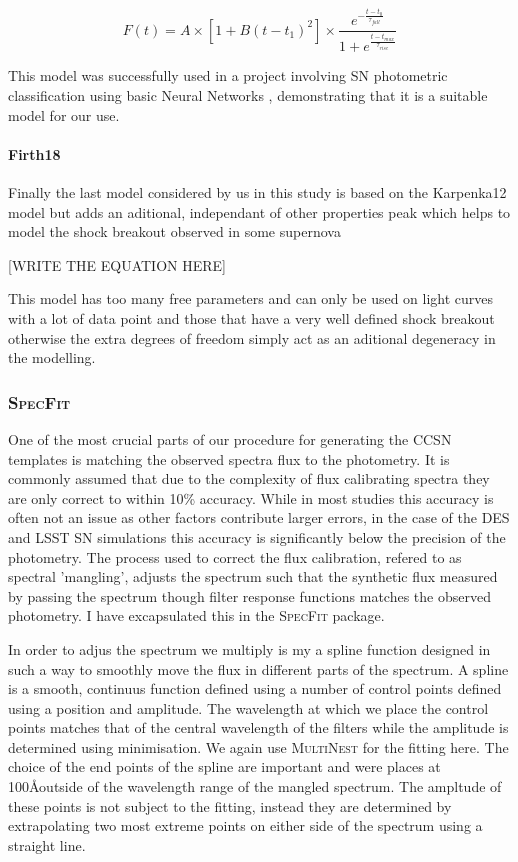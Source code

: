 \begin{equation}
  F(t) = A \times [1 + B(t - {t_1})^2] \times \frac{e^{-\frac{t - t_{0}}{\tau_{fall}}}} {1 + e^{\frac{t - t_{max}}{\tau_{rise}}}}
\end{equation}

This model was successfully used in a project involving SN photometric classification using basic Neural Networks \citep{Karpenka2012}, demonstrating that it is a suitable model for our use.

\paragraph{Firth18}
Finally the last model considered by us in this study is based on the Karpenka12 model but adds an aditional, independant of other properties peak which helps to model the shock breakout observed in some supernova

[WRITE THE EQUATION HERE]

This model has too many free parameters and can only be used on light curves with a lot of data point and those that have a very well defined shock breakout otherwise the extra degrees of freedom simply act as an aditional degeneracy in the modelling.

\subsubsection{\textsc{SpecFit}}
One of the most crucial parts of our procedure for generating the CCSN templates is matching the observed spectra flux to the photometry. It is commonly assumed that due to the complexity of flux calibrating spectra they are only correct to within 10\% accuracy. While in most studies this accuracy is often not an issue as other factors contribute larger errors, in the case of the DES and LSST SN simulations this accuracy is significantly below the precision of the photometry. The process used to correct the flux calibration, refered to as spectral 'mangling', adjusts the spectrum such that the synthetic flux measured by passing the spectrum though filter response functions matches the observed photometry. I have excapsulated this in the \textsc{SpecFit} package.

In order to adjus the spectrum we multiply is my a spline function designed in such a way to smoothly move the flux in different parts of the spectrum. A spline is a smooth, continuus function defined using a number of control points defined using a position and amplitude. The wavelength at which we place the control points matches that of the central wavelength of the filters while the amplitude is determined using minimisation. We again use \textsc{MultiNest} for the fitting here. The choice of the end points of the spline are important and were places at 100\AA outside of the wavelength range of the mangled spectrum. The ampltude of these points is not subject to the fitting, instead they are determined by extrapolating two most extreme points on either side of the spectrum using a straight line.

